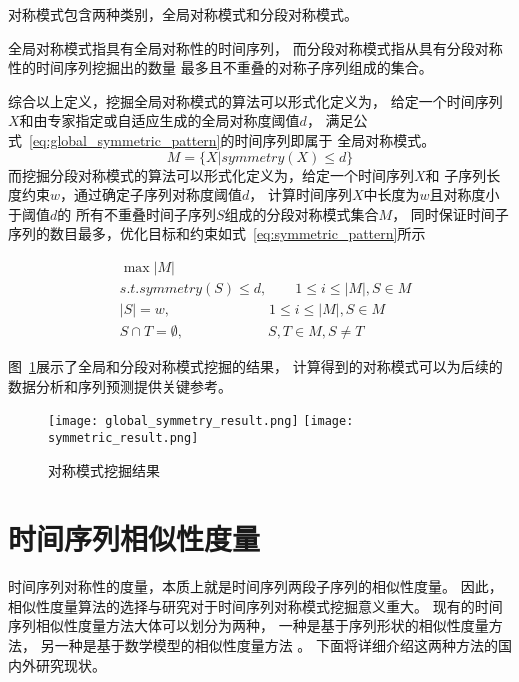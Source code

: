 \begin{definition}
  对称模式包含两种类别，全局对称模式和分段对称模式。

  全局对称模式指具有全局对称性的时间序列，
  而分段对称模式指从具有分段对称性的时间序列挖掘出的数量
  最多且不重叠的对称子序列组成的集合\cite{2022968}。 
  
\end{definition}

综合以上定义，挖掘全局对称模式的算法可以形式化定义为，
给定一个时间序列$X$和由专家指定或自适应生成的全局对称度阈值$d$，
满足公式~\ref{eq:global_symmetric_pattern}的时间序列即属于
全局对称模式。
\begin{equation}
  M = \{X | symmetry(X) \leq d\}
  \label{eq:global_symmetric_pattern}
\end{equation}
而挖掘分段对称模式的算法可以形式化定义为，给定一个时间序列$X$和
子序列长度约束$w$，通过确定子序列对称度阈值$d$，
计算时间序列$X$中长度为$w$且对称度小于阈值$d$的
所有不重叠时间子序列$S$组成的分段对称模式集合$M$，
同时保证时间子序列的数目最多，优化目标和约束如式~\ref{eq:symmetric_pattern}所示

\begin{equation}
  \begin{split}
    & \max \left| M \right| \\
    & s.t. symmetry \left( S \right) \leq d, \qquad 1 \leq i \leq \left| M \right|,S \in M \\
    & \left| S \right| = w, \qquad \qquad \qquad \quad 1 \leq i \leq \left| M \right|,S \in M \\
    & S \cap T = \emptyset, \qquad \qquad \qquad S,T \in M,S \neq T
  \end{split}
  \label{eq:symmetric_pattern}
\end{equation}

图~\ref{fig:symmetric_result}展示了全局和分段对称模式挖掘的结果，
计算得到的对称模式可以为后续的数据分析和序列预测提供关键参考。
\begin{figure}
  \centering
    {\texttt{[image: global\_symmetry\_result.png]}}
    {\texttt{[image: symmetric\_result.png]}}
  \caption{对称模式挖掘结果}
  \label{fig:symmetric_result}
\end{figure}

\section{时间序列相似性度量}
时间序列对称性的度量，本质上就是时间序列两段子序列的相似性度量。
因此，相似性度量算法的选择与研究对于时间序列对称模式挖掘意义重大。
现有的时间序列相似性度量方法大体可以划分为两种，
一种是基于序列形状的相似性度量方法，
另一种是基于数学模型的相似性度量方法
\cite{DBLP:journals/vldb/SuLZZZ20}。
下面将详细介绍这两种方法的国内外研究现状。

